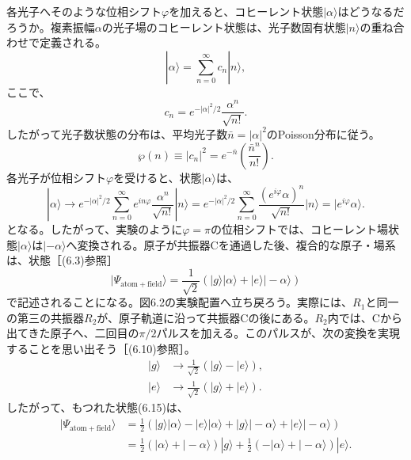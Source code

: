 各光子へそのような位相シフト$\varphi$を加えると、コヒーレント状態$|\alpha\rangle$はどうなるだろうか。複素振幅$\alpha$の光子場のコヒーレント状態は、光子数固有状態$|n\rangle$の重ね合わせで定義される\cite{ref238,ref239,ref240,ref241}。
\begin{equation}|\alpha\rangle=\sum_{n=0}^\infty c_n|n\rangle,\tag{6.11}\end{equation}
ここで、
\begin{equation}c_n=e^{-|\alpha|^2/2}\frac{\alpha^n}{\sqrt{n!}}.\tag{6.12}\end{equation}
したがって光子数状態の分布は、平均光子数$\bar n=|\alpha|^2$のPoisson分布に従う。
\begin{equation}\wp(n)\equiv|c_n|^2=e^{-\bar n}\left(\frac{\bar n^n}{n!}\right).\tag{6.13}\end{equation}
各光子が位相シフト$\varphi$を受けると、状態$|\alpha\rangle$は、
\hypertarget{srcpage:250}{}\label{srcpage:250}
\begin{equation}
|\alpha\rangle\longrightarrow e^{-|\alpha|^2/2}\sum_{n=0}^\infty e^{in\varphi}\frac{\alpha^n}{\sqrt{n!}}|n\rangle
=e^{-|\alpha|^2/2}\sum_{n=0}^\infty\frac{(e^{i\varphi}\alpha)^n}{\sqrt{n!}}|n\rangle=|e^{i\varphi}\alpha\rangle.\tag{6.14}
\end{equation}
となる。したがって、実験のように$\varphi=\pi$の位相シフトでは、コヒーレント場状態$|\alpha\rangle$は$|-\alpha\rangle$へ変換される。原子が共振器Cを通過した後、複合的な原子・場系は、状態［(6.3)参照］
\begin{equation}|\Psi_{\mathrm{atom+field}}\rangle=\frac1{\sqrt2}(|g\rangle|\alpha\rangle+|e\rangle|-\alpha\rangle)\tag{6.15}\end{equation}
で記述されることになる。図6.2の実験配置へ立ち戻ろう。実際には、$R_1$と同一の第三の共振器$R_2$が、原子軌道に沿って共振器Cの後にある。$R_2$内では、Cから出てきた原子へ、二回目の$\pi/2$パルスを加える。このパルスが、次の変換を実現することを思い出そう［(6.10)参照］。
\begin{equation}\begin{aligned}|g\rangle&\longrightarrow\frac1{\sqrt2}(|g\rangle-|e\rangle),\\|e\rangle&\longrightarrow\frac1{\sqrt2}(|g\rangle+|e\rangle).\end{aligned}\tag{6.16}\end{equation}
したがって、もつれた状態(6.15)は、
\begin{equation}\begin{aligned}
|\Psi_{\mathrm{atom+field}}\rangle&=\frac12(|g\rangle|\alpha\rangle-|e\rangle|\alpha\rangle+|g\rangle|-\alpha\rangle+|e\rangle|-\alpha\rangle)\\
&=\frac12(|\alpha\rangle+|-\alpha\rangle)|g\rangle+\frac12(-|\alpha\rangle+|-\alpha\rangle)|e\rangle.
\end{aligned}\tag{6.17}\end{equation}
